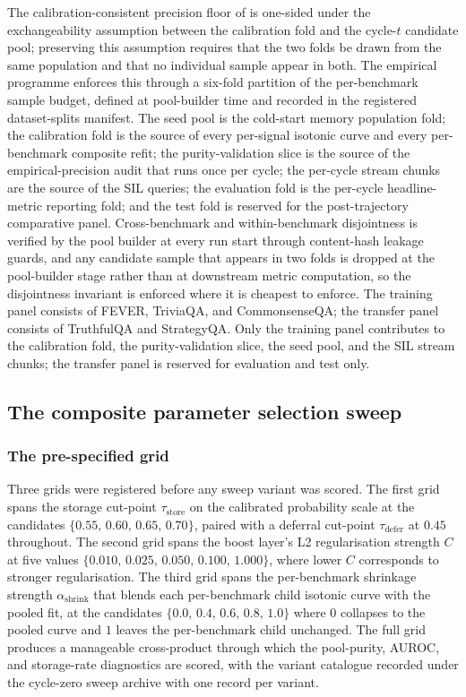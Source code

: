 The calibration-consistent precision floor of  is one-sided under the exchangeability assumption between the calibration fold and the cycle-$t$ candidate pool; preserving this assumption requires that the two folds be drawn from the same population and that no individual sample appear in both. The empirical programme enforces this through a six-fold partition of the per-benchmark sample budget, defined at pool-builder time and recorded in the registered dataset-splits manifest. The seed pool is the cold-start memory population fold; the calibration fold is the source of every per-signal isotonic curve and every per-benchmark composite refit; the purity-validation slice is the source of the empirical-precision audit that runs once per cycle; the per-cycle stream chunks are the source of the SIL queries; the evaluation fold is the per-cycle headline-metric reporting fold; and the test fold is reserved for the post-trajectory comparative panel. Cross-benchmark and within-benchmark disjointness is verified by the pool builder at every run start through content-hash leakage guards, and any candidate sample that appears in two folds is dropped at the pool-builder stage rather than at downstream metric computation, so the disjointness invariant is enforced where it is cheapest to enforce. The training panel consists of FEVER, TriviaQA, and CommonsenseQA; the transfer panel consists of TruthfulQA and StrategyQA. Only the training panel contributes to the calibration fold, the purity-validation slice, the seed pool, and the SIL stream chunks; the transfer panel is reserved for evaluation and test only.

\subsection{The composite parameter selection sweep}
\label{sec:adj-sweep}

\subsubsection{The pre-specified grid}
\label{sec:adj-grid}

Three grids were registered before any sweep variant was scored. The first grid spans the storage cut-point $\tau_{\text{store}}$ on the calibrated probability scale at the candidates $\{0.55,\, 0.60,\, 0.65,\, 0.70\}$, paired with a deferral cut-point $\tau_{\text{defer}}$ at $0.45$ throughout. The second grid spans the boost layer's L2 regularisation strength $C$ at five values $\{0.010,\, 0.025,\, 0.050,\, 0.100,\, 1.000\}$, where lower $C$ corresponds to stronger regularisation. The third grid spans the per-benchmark shrinkage strength $\alpha_{\text{shrink}}$ that blends each per-benchmark child isotonic curve with the pooled fit, at the candidates $\{0.0,\, 0.4,\, 0.6,\, 0.8,\, 1.0\}$ where $0$ collapses to the pooled curve and $1$ leaves the per-benchmark child unchanged. The full grid produces a manageable cross-product through which the pool-purity, AUROC, and storage-rate diagnostics are scored, with the variant catalogue recorded under the cycle-zero sweep archive with one record per variant.

